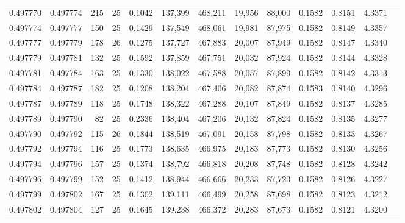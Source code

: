 \begin{tabular}{rrrrrrrrrrrrr}
0.497770 & 0.497774 & 215 &  25 &                                     0.1042 & 137,399 & 468,211 &  19,956 &  88,000 & 0.1582 & 0.8151 & 4.3371 \\
0.497774 & 0.497777 & 150 &  25 &                                     0.1429 & 137,549 & 468,061 &  19,981 &  87,975 & 0.1582 & 0.8149 & 4.3357 \\
0.497777 & 0.497779 & 178 &  26 &                                     0.1275 & 137,727 & 467,883 &  20,007 &  87,949 & 0.1582 & 0.8147 & 4.3340 \\
0.497779 & 0.497781 & 132 &  25 &                                     0.1592 & 137,859 & 467,751 &  20,032 &  87,924 & 0.1582 & 0.8144 & 4.3328 \\
0.497781 & 0.497784 & 163 &  25 &                                     0.1330 & 138,022 & 467,588 &  20,057 &  87,899 & 0.1582 & 0.8142 & 4.3313 \\
0.497784 & 0.497787 & 182 &  25 &                                     0.1208 & 138,204 & 467,406 &  20,082 &  87,874 & 0.1583 & 0.8140 & 4.3296 \\
0.497787 & 0.497789 & 118 &  25 &                                     0.1748 & 138,322 & 467,288 &  20,107 &  87,849 & 0.1582 & 0.8137 & 4.3285 \\
0.497789 & 0.497790 &  82 &  25 &                                     0.2336 & 138,404 & 467,206 &  20,132 &  87,824 & 0.1582 & 0.8135 & 4.3277 \\
0.497790 & 0.497792 & 115 &  26 &                                     0.1844 & 138,519 & 467,091 &  20,158 &  87,798 & 0.1582 & 0.8133 & 4.3267 \\
0.497792 & 0.497794 & 116 &  25 &                                     0.1773 & 138,635 & 466,975 &  20,183 &  87,773 & 0.1582 & 0.8130 & 4.3256 \\
0.497794 & 0.497796 & 157 &  25 &                                     0.1374 & 138,792 & 466,818 &  20,208 &  87,748 & 0.1582 & 0.8128 & 4.3242 \\
0.497796 & 0.497799 & 152 &  25 &                                     0.1412 & 138,944 & 466,666 &  20,233 &  87,723 & 0.1582 & 0.8126 & 4.3227 \\
0.497799 & 0.497802 & 167 &  25 &                                     0.1302 & 139,111 & 466,499 &  20,258 &  87,698 & 0.1582 & 0.8123 & 4.3212 \\
0.497802 & 0.497804 & 127 &  25 &                                     0.1645 & 139,238 & 466,372 &  20,283 &  87,673 & 0.1582 & 0.8121 & 4.3200 \\

\end{tabular}
